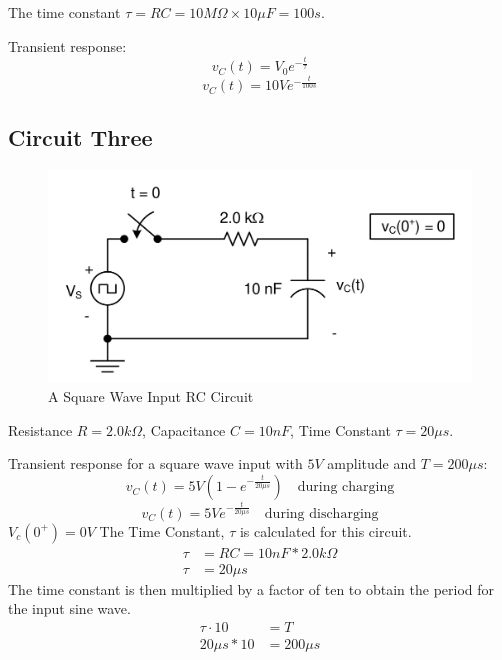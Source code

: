\documentclass[12pt]{article}
\begin{document}
The time constant $\tau = RC = 10M\Omega \times 10\mu F = 100s$.

Transient response:
\[
	v_C(t) = V_0 e^{-\frac{t}{\tau}}
\]
\[
	v_C(t) = 10V e^{-\frac{t}{100s}}
\]
\subsection{Circuit Three}
\begin{figure}[H]
	\centering
	\includegraphics[width=14cm]{e5_3}
	\caption{A Square Wave Input RC Circuit}
\end{figure}
Resistance $R = 2.0k\Omega$, Capacitance $C = 10nF$, Time Constant $\tau = 20\mu s$.

Transient response for a square wave input with $5V$ amplitude and $T = 200\mu s$:
\[
	v_C(t) = 5V(1 - e^{-\frac{t}{20\mu s}}) \quad \text{during charging}
\]
\[
	v_C(t) = 5V e^{-\frac{t}{20\mu s}} \quad \text{during discharging}
\]
$V_c(0^+) = 0V$
The Time Constant, $\tau$ is calculated for this circuit.
\begin{align*}
	\tau & = RC = 10nF * 2.0k\Omega \\
	\tau & = 20\mu s
\end{align*}
The time constant is then multiplied by a factor of ten to obtain the period for
the input sine wave.
\begin{align*}
	\tau \cdot 10 & = T        \\
	20\mu s * 10  & = 200\mu s \\
\end{align*}
\end{document}
